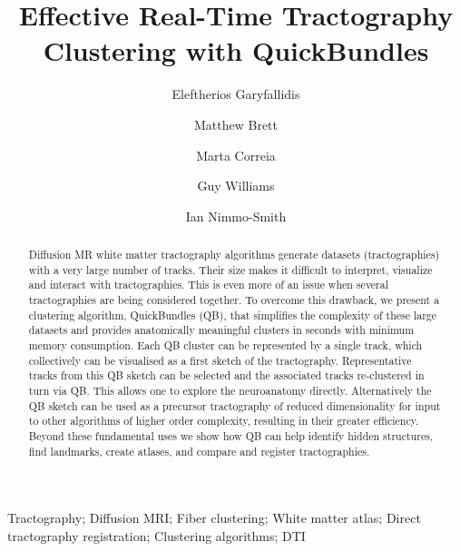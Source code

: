 \documentclass[preprint,authoryear,a4paper,10pt,onecolumn]{elsarticle}
\begin{document}
\begin{frontmatter}

\title{Effective Real-Time Tractography Clustering with QuickBundles}%

\author[UC]{Eleftherios Garyfallidis}
\address[UC]{University of Cambridge, Wolfson College, Barton Road, Cambridge CB3 9BB, UK}

\author[Berkeley]{Matthew Brett}
\address[Berkeley]{University of California, Henry H. Wheeler, Jr. Brain Imaging Center, 10 Giannini Hall, Berkeley, CA 94720,USA}

\author[CBU]{Marta Correia} 
\address[CBU]{MRC Cognition and Brain Sciences Unit, 15 Chaucer Road, Cambridge CB2 7EF, UK}

\author[WBIC]{Guy Williams} 
\address[WBIC]{The Wolfson Brain Imaging Centre, University of Cambridge, Box 65, Addenbrooke's Hospital, Cambridge CB2 0QQ, UK}

\author[CBU]{Ian Nimmo-Smith} 

\begin{abstract}
  Diffusion MR white matter tractography algorithms generate datasets
  (tractographies) with a very large number of tracks. Their size makes
  it difficult to interpret, visualize and interact with
  tractographies. This is even more of an issue when several
  tractographies are being considered together. To overcome this
  drawback, we present a clustering algorithm, QuickBundles (QB), that
  simplifies the complexity of these large datasets and provides
  anatomically meaningful clusters in seconds with minimum memory
  consumption. Each QB cluster can be represented by a single track,
  which collectively can be visualised as a first sketch of the
  tractography.  Representative tracks from this QB sketch can be
  selected and the associated tracks re-clustered in turn via QB. This
  allows one to explore the neuroanatomy directly. Alternatively the QB
  sketch can be used as a precursor tractography of reduced
  dimensionality for input to other algorithms of higher order
  complexity, resulting in their greater efficiency. Beyond these
  fundamental uses we show how QB can help identify hidden structures,
  find landmarks, create atlases, and compare and register
  tractographies.
\end{abstract}

\begin{keyword}
Tractography;
Diffusion MRI;
Fiber clustering;
White matter atlas;
Direct tractography registration;
Clustering algorithms;
DTI
\end{keyword}
\end{frontmatter}
\end{document}
